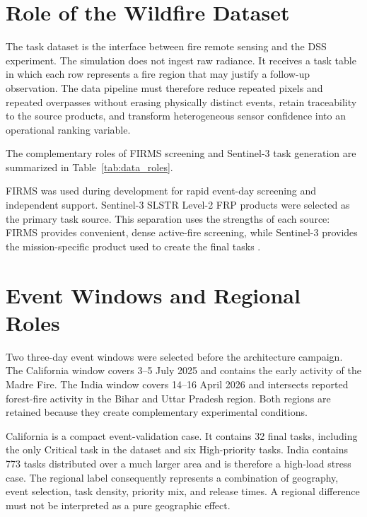 \section{Role of the Wildfire Dataset}

The task dataset is the interface between fire remote sensing and the DSS experiment. The simulation does not ingest raw radiance. It receives a task table in which each row represents a fire region that may justify a follow-up observation. The data pipeline must therefore reduce repeated pixels and repeated overpasses without erasing physically distinct events, retain traceability to the source products, and transform heterogeneous sensor confidence into an operational ranking variable.

The complementary roles of FIRMS screening and Sentinel-3 task generation are summarized in Table~\ref{tab:data_roles}.

\begingroup\sloppy
FIRMS was used during development for rapid event-day screening and independent support. Sentinel-3 SLSTR Level-2 FRP products were selected as the primary task source. This separation uses the strengths of each source: FIRMS provides convenient, dense active-fire screening, while Sentinel-3 provides the mission-specific product used to create the final tasks \citep{FIRMS,Sentinel3SLSTR,Schroeder2014,WoosterSLSTR2012,XuWooster2023}.\par
\endgroup

\section{Event Windows and Regional Roles}

Two three-day event windows were selected before the architecture campaign. The California window covers 3--5 July 2025 and contains the early activity of the Madre Fire. The India window covers 14--16 April 2026 and intersects reported forest-fire activity in the Bihar and Uttar Pradesh region. Both regions are retained because they create complementary experimental conditions.

California is a compact event-validation case. It contains 32 final tasks, including the only Critical task in the dataset and six High-priority tasks. India contains 773 tasks distributed over a much larger area and is therefore a high-load stress case. The regional label consequently represents a combination of geography, event selection, task density, priority mix, and release times. A regional difference must not be interpreted as a pure geographic effect.

